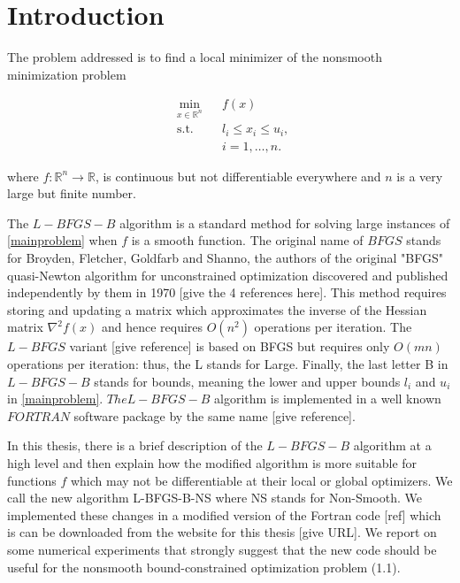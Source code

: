 
\chapter{Introduction} %

\label{Chapter1} %


The problem addressed is to find a local minimizer of the nonsmooth minimization problem

\begin{equation} \label{mainproblem}
  \begin{aligned}
    & \underset{x \in \mathbb{R}^n}{\text{min}}
    & & f(x) \\
    & \text{s.t.}
    & & l_i \leq x_i \leq u_i , \; \\
    & & & i = 1, \ldots, n.
  \end{aligned}
\end{equation}

where $f \colon \mathbb{R}^n \to \mathbb{R}$, is continuous but not differentiable everywhere and $n$ is a very large but finite number.

The $L-BFGS-B$ algorithm \citep{lbfgsboriginal} is a standard method for solving large instances of \ref{mainproblem} when $f$ is a smooth function. The original name of $BFGS$ stands for Broyden, Fletcher, Goldfarb and Shanno, the authors
of the original "BFGS" quasi-Newton algorithm for unconstrained
optimization discovered and published
independently by them in 1970 [give the 4 references here].
This method requires storing and updating a matrix which 
approximates the inverse of the Hessian matrix $\nabla^2 f(x)$ and
hence requires $O(n^2)$ operations per iteration.  
The $L-BFGS$ variant [give reference] is based on BFGS
but requires only $O(mn)$ operations per iteration: thus,
the L stands for Large.  Finally, the last letter B in 
$L-BFGS-B$ stands for bounds, meaning the lower and upper
bounds $l_i$ and $u_i$ in \ref{mainproblem}.  $The L-BFGS-B$ algorithm
is implemented in a well known $FORTRAN$ software package
by the same name [give reference].

In this thesis, there is a brief description of the $L-BFGS-B$ algorithm
at a high level and then explain how the modified algorithm
is more suitable for functions $f$ which may not be
differentiable at their local or global optimizers.  
We call the new algorithm L-BFGS-B-NS where NS stands for
Non-Smooth.  We implemented these changes in a modified version 
of the Fortran code [ref] which is can be downloaded from the website
for this thesis [give URL].  We report on some numerical experiments 
that strongly suggest that the new code should be useful for the
nonsmooth bound-constrained optimization problem (1.1).

